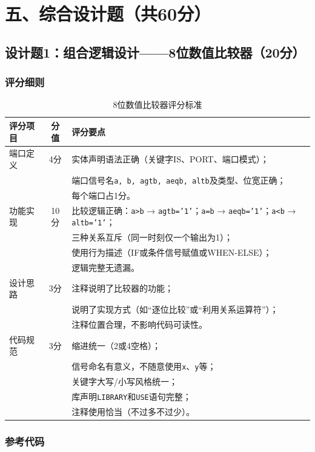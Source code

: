 \newpage

\section{五、综合设计题（共60分）}

\subsection{设计题1：组合逻辑设计——8位数值比较器（20分）}

\subsubsection*{评分细则}

\begin{table}[h!]
\centering
\caption{8位数值比较器评分标准}
\begin{tabular}{|l|c|p{10cm}|}
\hline
\textbf{评分项目} & \textbf{分值} & \textbf{评分要点} \\
\hline
端口定义 & 4分 &
实体声明语法正确（关键字IS、PORT、端口模式）；\\
&&端口信号名\texttt{a, b, agtb, aeqb, altb}及类型、位宽正确；\\
&&每个端口占1分。\\
\hline
功能实现 & 10分 &
比较逻辑正确：\texttt{a>b} → \texttt{agtb='1'}；\texttt{a=b} → \texttt{aeqb='1'}；\texttt{a<b} → \texttt{altb='1'}；\\
&&三种关系互斥（同一时刻仅一个输出为1）；\\
&&使用行为描述（IF或条件信号赋值或WHEN-ELSE）；\\
&&逻辑完整无遗漏。\\
\hline
设计思路 & 3分 &
注释说明了比较器的功能；\\
&&说明了实现方式（如“逐位比较”或“利用关系运算符”）；\\
&&注释位置合理，不影响代码可读性。\\
\hline
代码规范 & 3分 &
缩进统一（2或4空格）；\\
&&信号命名有意义，不随意使用\texttt{x}、\texttt{y}等；\\
&&关键字大写/小写风格统一；\\
&&库声明\texttt{LIBRARY}和\texttt{USE}语句完整；\\
&&注释使用恰当（不过多不过少）。\\
\hline
\end{tabular}
\end{table}

\subsubsection*{参考代码}

